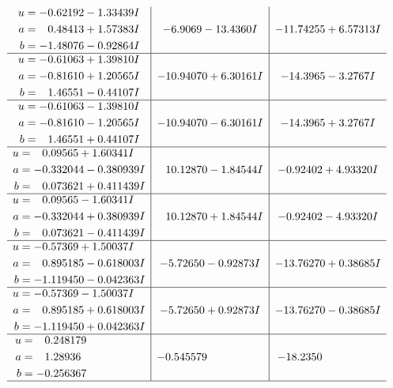 \documentclass[1p]{elsarticle_modified}
\theoremstyle{definition}
\begin{document}
$$\begin{array}{c|c|c}
\begin{aligned}
u &= -0.62192 - 1.33439 I \\
a &= \phantom{-}0.48413 + 1.57383 I \\
b &= -1.48076 - 0.92864 I\end{aligned}
 & -6.9069 - 13.4360 I & -11.74255 + 6.57313 I \\ \hline\begin{aligned}
u &= -0.61063 + 1.39810 I \\
a &= -0.81610 + 1.20565 I \\
b &= \phantom{-}1.46551 - 0.44107 I\end{aligned}
 & -10.94070 + 6.30161 I & -14.3965 - 3.2767 I \\ \hline\begin{aligned}
u &= -0.61063 - 1.39810 I \\
a &= -0.81610 - 1.20565 I \\
b &= \phantom{-}1.46551 + 0.44107 I\end{aligned}
 & -10.94070 - 6.30161 I & -14.3965 + 3.2767 I \\ \hline\begin{aligned}
u &= \phantom{-}0.09565 + 1.60341 I \\
a &= -0.332044 - 0.380939 I \\
b &= \phantom{-}0.073621 + 0.411439 I\end{aligned}
 & \phantom{-}10.12870 - 1.84544 I & -0.92402 + 4.93320 I \\ \hline\begin{aligned}
u &= \phantom{-}0.09565 - 1.60341 I \\
a &= -0.332044 + 0.380939 I \\
b &= \phantom{-}0.073621 - 0.411439 I\end{aligned}
 & \phantom{-}10.12870 + 1.84544 I & -0.92402 - 4.93320 I \\ \hline\begin{aligned}
u &= -0.57369 + 1.50037 I \\
a &= \phantom{-}0.895185 - 0.618003 I \\
b &= -1.119450 - 0.042363 I\end{aligned}
 & -5.72650 - 0.92873 I & -13.76270 + 0.38685 I \\ \hline\begin{aligned}
u &= -0.57369 - 1.50037 I \\
a &= \phantom{-}0.895185 + 0.618003 I \\
b &= -1.119450 + 0.042363 I\end{aligned}
 & -5.72650 + 0.92873 I & -13.76270 - 0.38685 I \\ \hline\begin{aligned}
u &= \phantom{-}0.248179\phantom{ +0.000000I} \\
a &= \phantom{-}1.28936\phantom{ +0.000000I} \\
b &= -0.256367\phantom{ +0.000000I}\end{aligned}
 & -0.545579\phantom{ +0.000000I} & -18.2350\phantom{ +0.000000I}\\
 \hline 
 \end{array}$$\newpage\newpage\renewcommand{\arraystretch}{1}
\end{document}
